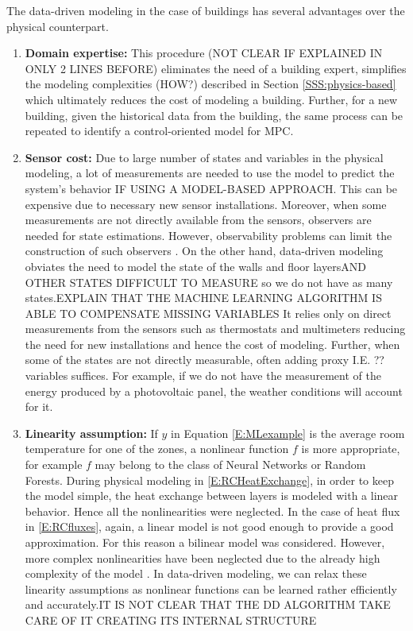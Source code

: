 \textcolor[rgb]{0,0,1}{The data-driven modeling in the case of buildings has several advantages over the physical counterpart.}
\begin{enumerate}
	
	\item \textcolor[rgb]{0,0,1}{\textbf{Domain expertise:} 
	This procedure (\textcolor[rgb]{1,0,0}{NOT CLEAR IF EXPLAINED IN ONLY 2 LINES BEFORE}) eliminates the need of a building expert, simplifies the modeling complexities (\textcolor[rgb]{1,0,0}{HOW?}) described in Section \ref{SSS:physics-based} which ultimately reduces the cost of modeling a building. Further, for a new building, given the historical data from the building, the same process can be repeated to identify a control-oriented model for MPC.}
	
	\item \textcolor[rgb]{0,0,1}{\textbf{Sensor cost:}
	Due to large number of states and variables in the physical modeling, a lot of measurements are needed to use the model to predict the system's behavior \textcolor[rgb]{1,0,0}{IF USING A MODEL-BASED APPROACH}.
	This can be expensive due to necessary new sensor installations.
	Moreover, when some measurements are not directly available from the sensors, observers are needed for state estimations.
	However, observability problems can limit the construction of such observers \cite{Dorf2011MCS}. 
	On the other hand, data-driven modeling obviates the need to model the state of the walls and floor layers\textcolor[rgb]{1,0,0}{AND OTHER STATES DIFFICULT TO MEASURE} so we do not have as many states.\textcolor[rgb]{1,0,0}{EXPLAIN THAT THE MACHINE LEARNING ALGORITHM IS ABLE TO COMPENSATE MISSING VARIABLES}
	It relies only on direct measurements from the sensors such as thermostats and multimeters reducing the need for new installations and hence the cost of modeling.
	Further, when some of the states are not directly measurable, often adding proxy \textcolor[rgb]{1,0,0}{I.E. ??}variables suffices. 
	For example, if we do not have the measurement of the energy produced by a photovoltaic panel, the weather conditions will account for it.}
	
	\item \textcolor[rgb]{0,0,1}{\textbf{Linearity assumption:}
	If \(y\) in Equation \eqref{E:MLexample} is the average room temperature for one of the zones, a nonlinear function \(f\) is more appropriate, for example \(f\) may belong to the class of Neural Networks or Random Forests. 
	During physical modeling in \eqref{E:RCHeatExchange}, in order to keep the model simple, the heat exchange between layers is modeled with a linear behavior. 
	Hence all the nonlinearities were neglected.
	In the case of heat flux in \eqref{E:RCfluxes}, again, a linear model is not good enough to provide a good approximation. For this reason a bilinear model was considered.
	However, more complex nonlinearities have been neglected due to the already high complexity of the model \cite{Sturzenegger2016}. 
	In data-driven modeling, we can relax these linearity assumptions as nonlinear functions can be learned rather efficiently and accurately.\textcolor[rgb]{1,0,0}{IT IS NOT CLEAR THAT THE DD ALGORITHM TAKE CARE OF IT CREATING ITS INTERNAL STRUCTURE}}
	

\end{enumerate}
